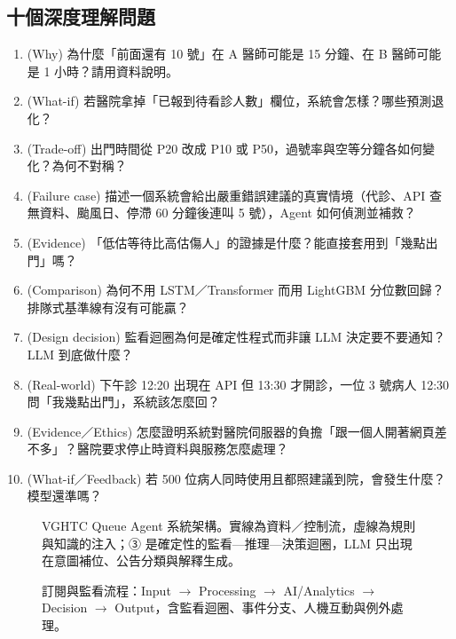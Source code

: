 \documentclass[11pt,twocolumn]{article}
\begin{document}
\subsection{十個深度理解問題}
\begin{enumerate}[label=Q\arabic*.,leftmargin=2.2em]
\item (Why) 為什麼「前面還有 10 號」在 A 醫師可能是 15 分鐘、在 B 醫師可能是 1 小時？請用資料說明。
\item (What-if) 若醫院拿掉「已報到待看診人數」欄位，系統會怎樣？哪些預測退化？
\item (Trade-off) 出門時間從 P20 改成 P10 或 P50，過號率與空等分鐘各如何變化？為何不對稱？
\item (Failure case) 描述一個系統會給出嚴重錯誤建議的真實情境（代診、API 查無資料、颱風日、停滯 60 分鐘後連叫 5 號），Agent 如何偵測並補救？
\item (Evidence) 「低估等待比高估傷人」的證據是什麼？能直接套用到「幾點出門」嗎？
\item (Comparison) 為何不用 LSTM／Transformer 而用 LightGBM 分位數回歸？排隊式基準線有沒有可能贏？
\item (Design decision) 監看迴圈為何是確定性程式而非讓 LLM 決定要不要通知？LLM 到底做什麼？
\item (Real-world) 下午診 12:20 出現在 API 但 13:30 才開診，一位 3 號病人 12:30 問「我幾點出門」，系統該怎麼回？
\item (Evidence／Ethics) 怎麼證明系統對醫院伺服器的負擔「跟一個人開著網頁差不多」？醫院要求停止時資料與服務怎麼處理？
\item (What-if／Feedback) 若 500 位病人同時使用且都照建議到院，會發生什麼？模型還準嗎？
\end{enumerate}

\begin{figure}[!t]
\centering
{\linespread{1}\selectfont\resizebox{\textwidth}{!}{}}
\caption{VGHTC Queue Agent 系統架構。實線為資料／控制流，虛線為規則與知識的注入；③ 是確定性的監看—推理—決策迴圈，LLM 只出現在意圖補位、公告分類與解釋生成。}
\label{fig:arch}
\end{figure}

\begin{figure}[!t]
\centering
{\linespread{1}\selectfont\resizebox{\textwidth}{!}{}}
\caption{訂閱與監看流程：Input $\rightarrow$ Processing $\rightarrow$ AI/Analytics $\rightarrow$ Decision $\rightarrow$ Output，含監看迴圈、事件分支、人機互動與例外處理。}
\label{fig:flow}
\end{figure}
\end{document}
